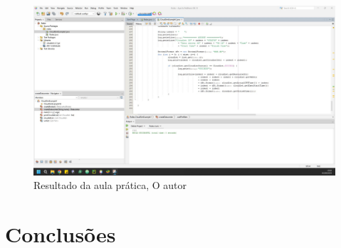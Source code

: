 \begin{figure}[h]
  \center
  \includegraphics[width=\textwidth]{figure/result_pratic.jpg}
  \caption{Resultado da aula prática, O autor}
  \label{fig:result_pratic}
\end{figure}


\section{Conclusões}






